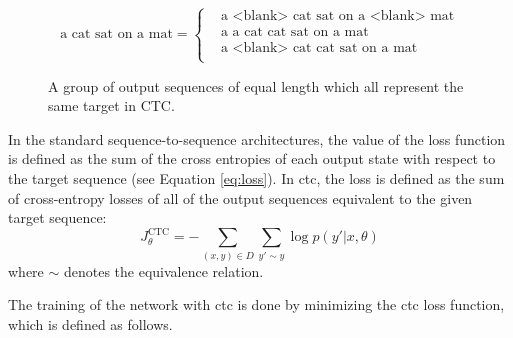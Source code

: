 \begin{figure}
  \centering
  \begin{minipage}{\textwidth}
    \begin{equation*}
        \text{a cat sat on a mat} =
        \begin{cases}
          & \text{a <blank> cat sat on a <blank> mat} \\
          & \text{a a cat cat sat on a mat} \\
          & \text{a <blank> cat cat sat on a mat} \\
        \end{cases}
    \end{equation*}
  \end{minipage}
  \caption{A group of output sequences of equal length which all represent the
    same target in CTC.} %
  \label{fig:ctc-equivalent-sequences}
\end{figure}

In the standard sequence-to-sequence architectures, the value of the loss
function is defined as the sum of the cross entropies of each output state with
respect to the target sequence (see Equation \ref{eq:loss}). In \gls{ctc}, the
loss is defined as the sum of cross-entropy losses of all of the output
sequences equivalent to the given target sequence:
%
\begin{equation}
  J_{\theta}^{\text{CTC}} = - \sum_{(x, y) \in D} \sum_{y' \sim y}  \log p(y' | x, \theta)
  \label{eq:ctc-loss}
\end{equation}
%
where $\sim$ denotes the equivalence relation.


The training of the network with \gls{ctc} is done
by minimizing the \gls{ctc} loss function, which is defined as follows.



